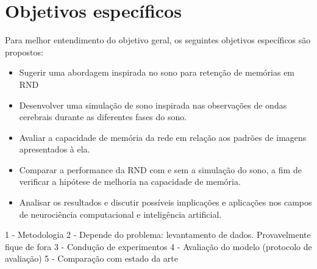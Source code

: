 \section{Objetivos específicos}

Para melhor entendimento do objetivo geral, os seguintes objetivos específicos são propostos:

\begin{itemize}

  \item Sugerir uma abordagem inspirada no sono para retenção de memórias em RND

  \item Desenvolver uma simulação de sono inspirada nas observações de ondas cerebrais durante as diferentes fases do sono.

  \item Avaliar a capacidade de memória da rede em relação aos padrões de imagens apresentados à ela.

  \item Comparar a performance da RND com e sem a simulação do sono, a fim de verificar a hipótese de melhoria na capacidade de
  memória.

  \item Analisar os resultados e discutir possíveis implicações e aplicações nos campos de neurociência computacional e
inteligência artificial.

\end{itemize}



1 - Metodologia 2 - Depende do problema: levantamento de dados. Provavelmente fique de fora 3 - Condução de experimentos 4 -
Avaliação do modelo (protocolo de avaliação) 5 - Comparação com estado da arte

